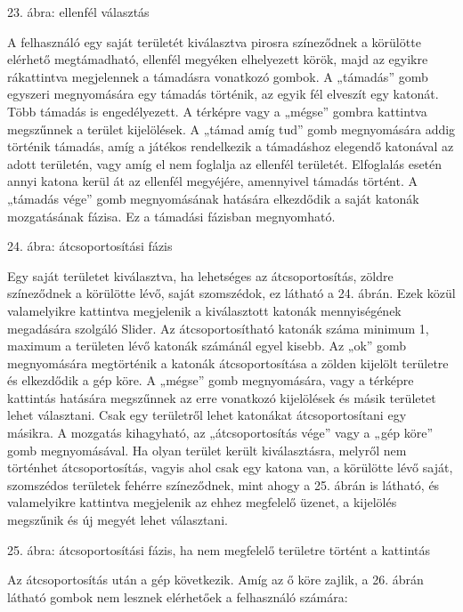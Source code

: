  

23. ábra: ellenfél választás 

A felhasználó egy saját területét kiválasztva pirosra színeződnek a körülötte elérhető megtámadható, ellenfél megyéken elhelyezett körök, majd az egyikre rákattintva megjelennek a támadásra vonatkozó gombok. A „támadás” gomb egyszeri megnyomására egy támadás történik, az egyik fél elveszít egy katonát. Több támadás is engedélyezett. A térképre vagy a „mégse” gombra kattintva megszűnnek a terület kijelölések. A „támad amíg tud” gomb megnyomására addig történik támadás, amíg a játékos rendelkezik a támadáshoz elegendő katonával az adott területén, vagy amíg el nem foglalja az ellenfél területét. Elfoglalás esetén annyi katona kerül át az ellenfél megyéjére, amennyivel támadás történt. A „támadás vége” gomb megnyomásának hatására elkezdődik a saját katonák mozgatásának fázisa. Ez a támadási fázisban megnyomható. 

 

24. ábra: átcsoportosítási fázis 

Egy saját területet kiválasztva, ha lehetséges az átcsoportosítás, zöldre színeződnek a körülötte lévő, saját szomszédok, ez látható a 24. ábrán. Ezek közül valamelyikre kattintva megjelenik a kiválasztott katonák mennyiségének megadására szolgáló Slider. Az átcsoportosítható katonák száma minimum 1, maximum a területen lévő katonák számánál egyel kisebb. Az „ok” gomb megnyomására megtörténik a katonák átcsoportosítása a zölden kijelölt területre és elkezdődik a gép köre. A „mégse” gomb megnyomására, vagy a térképre kattintás hatására megszűnnek az erre vonatkozó kijelölések és másik területet lehet választani. Csak egy területről lehet katonákat átcsoportosítani egy másikra. A mozgatás kihagyható, az „átcsoportosítás vége” vagy a „gép köre” gomb megnyomásával. Ha olyan terület került kiválasztásra, melyről nem történhet átcsoportosítás, vagyis ahol csak egy katona van, a körülötte lévő saját, szomszédos területek fehérre színeződnek, mint ahogy a 25. ábrán is látható, és valamelyikre kattintva megjelenik az ehhez megfelelő üzenet, a kijelölés megszűnik és új megyét lehet választani.  

 

25. ábra: átcsoportosítási fázis, ha nem megfelelő területre történt a kattintás  

Az átcsoportosítás után a gép következik. Amíg az ő köre zajlik, a 26. ábrán látható gombok nem lesznek elérhetőek a felhasználó számára: 

 

